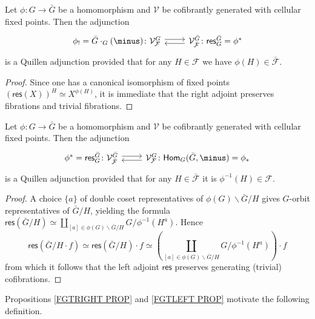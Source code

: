 \documentclass[a4paper,10pt]{article}%
\begin{document}
\begin{proposition}\label{FGTRIGHT PROP}
	Let $\phi \colon G \to \bar{G}$ be a homomorphism and $\mathcal{V}$ be cofibrantly generated with cellular fixed points.	
	Then the adjunction
\[
\begin{tikzcd}
	\phi_{!} = \bar{G} \cdot_G(\minus)
	\colon
	\mathcal{V}^{G}_{\mathcal{F}} \ar[shift left=1]{r}
&
	\mathcal{V}^{\bar{G}}_{\bar{\mathcal{F}}}
	\colon \ar[shift left=1]{l}
	\mathsf{res}^{\bar{G}}_G = \phi^{\**}
\end{tikzcd}
\]
is a Quillen adjunction provided that for any 
$H \in \mathcal{F}$ we have $\phi(H) \in \bar{\mathcal{F}}$.
\end{proposition}

\begin{proof}
Since one has a canonical isomorphism of fixed points
$\left(\mathsf{res}(X)\right)^H \simeq X^{\phi(H)}$,
it is immediate that the right adjoint preserves fibrations and trivial fibrations.
\end{proof}


\begin{proposition}\label{FGTLEFT PROP}
	Let $\phi \colon G \to \bar{G}$ be a homomorphism and $\mathcal{V}$ be cofibrantly generated with cellular fixed points.		
	Then the adjunction
\[
\begin{tikzcd}
	\phi^{\**} = \mathsf{res}^{\bar{G}}_G
	\colon
	\mathcal{V}^{\bar{G}}_{\mathcal{\bar{F}}} \ar[shift left=1]{r}
&
	\mathcal{V}^{G}_{\mathcal{F}}
	\colon \ar[shift left=1]{l}
	\mathsf{Hom}_G(\bar{G},\minus) = \phi_{\**}
\end{tikzcd}
\]
is a Quillen adjunction provided that for any 
$H \in \bar{\mathcal{F}}$ it is 
$\phi^{-1}(H) \in \mathcal{F}$.
\end{proposition}


\begin{proof}
	A choice $\{a\}$ of double coset representatives of 
	$\phi(G)\backslash \bar{G} /H$
	gives $G$-orbit representatives of
	$\bar{G}/H$, yielding the formula
	$\mathsf{res}(\bar{G}/H) \simeq 
	\coprod_{[a] \in \phi(G)\backslash \bar{G} /H}
	{G/\phi^{-1}(H^{a})}$.
%	
	Hence
\[
	\mathsf{res}\left(\bar{G}/H \cdot f\right)
		\simeq 
	\mathsf{res}\left(\bar{G}/H\right) \cdot f
		\simeq
	\left(
		\coprod_{[a] \in \phi(G)\backslash \bar{G} /H}
		{G/\phi^{-1}(H^{a})}
	\right)	\cdot f
\]
from which it follows that the left adjoint $\mathsf{res}$ preserves generating (trivial) cofibrations.
\end{proof}


Propositions \ref{FGTRIGHT PROP} and \ref{FGTLEFT PROP}
motivate the following definition.
\end{document}
